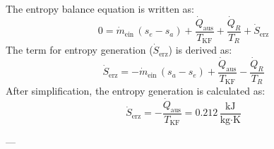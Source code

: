 The entropy balance equation is written as:  
\[
0 = \dot{m}_{\text{ein}} \, (s_e - s_a) + \frac{\dot{Q}_{\text{aus}}}{T_{\text{KF}}} + \frac{\dot{Q}_R}{T_R} + \dot{S}_{\text{erz}}
\]  
The term for entropy generation (\( \dot{S}_{\text{erz}} \)) is derived as:  
\[
\dot{S}_{\text{erz}} = -\dot{m}_{\text{ein}} \, (s_a - s_e) + \frac{\dot{Q}_{\text{aus}}}{T_{\text{KF}}} - \frac{\dot{Q}_R}{T_R}
\]  
After simplification, the entropy generation is calculated as:  
\[
\dot{S}_{\text{erz}} = -\frac{\dot{Q}_{\text{aus}}}{T_{\text{KF}}} = 0.212 \, \frac{\text{kJ}}{\text{kg·K}}
\]  

---